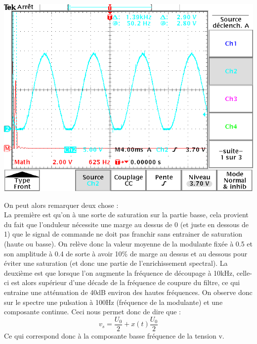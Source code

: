\documentclass[10pt,a4paper]{article}
\begin{document}
	\begin{center}
	\includegraphics[scale=0.5]{fft_vs_10000.png}
	\end{center}	
	On peut alors remarquer deux chose :\\
	La première est qu'on à une sorte de saturation sur la partie basse, cela provient du fait que l'onduleur nécessite une marge au dessus de 0 (et juste en dessous de 1) que le signal de commande ne doit pas franchir sans entrainer de saturation (haute ou basse). On relève donc la valeur moyenne de la modulante fixée à 0.5 et son amplitude à 0.4 de sorte à avoir 10\% de marge au dessus et au dessous pour éviter une saturation (et donc une partie de l'enrichissement spectral).
	La deuxième est que lorsque l'on augmente la fréquence de découpage à 10kHz, celle-ci est alors  supérieur d'une décade de la fréquence de coupure du filtre, ce qui entraine une atténuation de 40dB environ des hautes fréquences. On observe donc sur le spectre une pulsation à 100Hz (fréquence de la modulante) et une composante continue. Ceci nous permet donc de dire que :
	\[\boxed{v_s = \frac{U_0}{2} + x(t)\frac{U_0}{2}}\]
	Ce qui correspond donc à la composante basse fréquence de la tension v.
	\newpage
\end{document}

